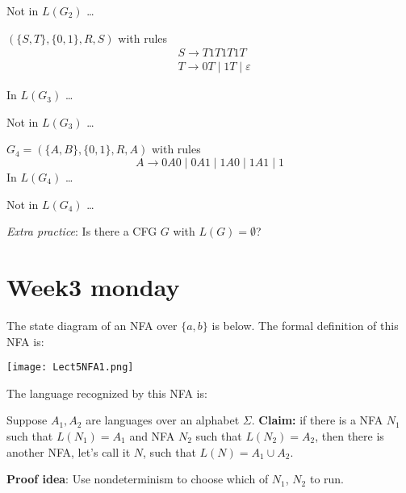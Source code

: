 \documentclass[12pt, oneside]{article}
\begin{document}
  \vspace{110pt}
  
  Not in $L(G_2)$ \ldots 

  \vspace{110pt}

  $(\{S, T\}, \{0, 1\}, R, S)$ with  rules
  \begin{align*}
  &S \to T1T1T1T \\
  &T \to  0T \mid 1T \mid \varepsilon
  \end{align*}

  In  $L(G_3)$ \ldots 
  
  \vspace{110pt}
  
  Not in $L(G_3)$ \ldots 

  \vspace{110pt}

\newpage
  $G_4 =  (\{A, B\}, \{0, 1\}, R, A)$ with rules
  \[
    A \to 0A0 \mid  0A1 \mid 1A0  \mid 1A1 \mid  1
  \]
  In  $L(G_4)$ \ldots 
  
  \vspace{110pt}
  
  Not in $L(G_4)$ \ldots 

  \vspace{110pt}

  
{\it Extra practice}: Is there a CFG $G$ with $L(G) = \emptyset$?
 \vfill
\section*{Week3 monday}


The state diagram of an NFA over $\{a,b\}$ is below.  The formal definition of this NFA is:

\texttt{[image: Lect5NFA1.png]}

The language recognized by this NFA is: 



Suppose $A_1, A_2$ are languages over an alphabet $\Sigma$.
{\bf Claim:} if there is a NFA $N_1$ such that $L(N_1) = A_1$ and 
NFA $N_2$ such that $L(N_2) = A_2$, then there is another NFA, let's call it $N$, such that 
$L(N) = A_1 \cup A_2$.

{\bf Proof idea}: Use nondeterminism to choose which of $N_1$, $N_2$ to run.
\end{document}
